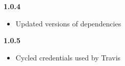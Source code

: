 \noindent
\textbf{1.0.4}
\begin{itemize}
	\renewcommand{\labelitemi}{$\bullet$}
	\item Updated versions of dependencies
\end{itemize}
\newline

\noindent
\textbf{1.0.5}
\begin{itemize}
	\renewcommand{\labelitemi}{$\bullet$}
	\item Cycled credentials used by Travis
\end{itemize}
\newline






